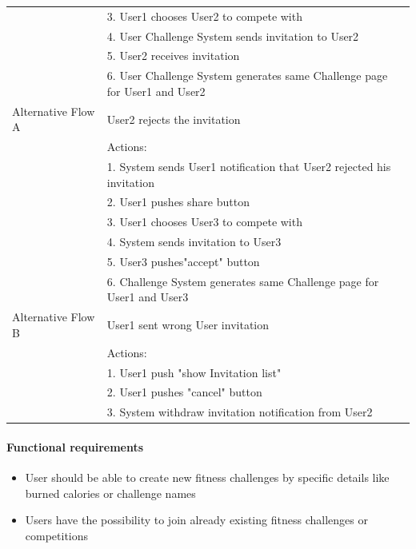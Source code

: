 \documentclass{article}
\begin{document}
\begin{table}[h!]
\begin{tabularx}{\textwidth}{|>{\raggedright\arraybackslash}p{}|X|}
                         & 3. User1 chooses User2 to compete with\\
                         & 4. User Challenge System sends invitation to User2 \\
                         & 5. User2 receives invitation\\
                         & 6. User Challenge System generates same Challenge page for User1 and User2 \\ \hline
        Alternative Flow A & User2 rejects the invitation\\
                         & Actions: \\
                         & 1. System sends User1 notification that User2 rejected his invitation \\
                         & 2. User1 pushes share button \\
                         & 3. User1 chooses User3 to compete with\\
                         & 4. System sends invitation to User3 \\
                         & 5. User3 pushes"accept" button \\
                         & 6. Challenge System generates same Challenge page for User1 and User3 \\ \hline
        Alternative Flow B & User1 sent wrong User invitation \\
                         & Actions: \\
                         & 1. User1 push "show Invitation list" \\
                         & 2. User1 pushes "cancel" button \\
                         & 3. System withdraw invitation notification from User2\\ \hline
    \end{tabularx}
\end{table}

\paragraph{Functional requirements}
		\begin{itemize}
			\item  User should be able to create new fitness challenges by specific details like burned calories or
			challenge names
			\item  Users have the possibility to join already existing fitness challenges or competitions
		\end{itemize}
		
\end{document}
